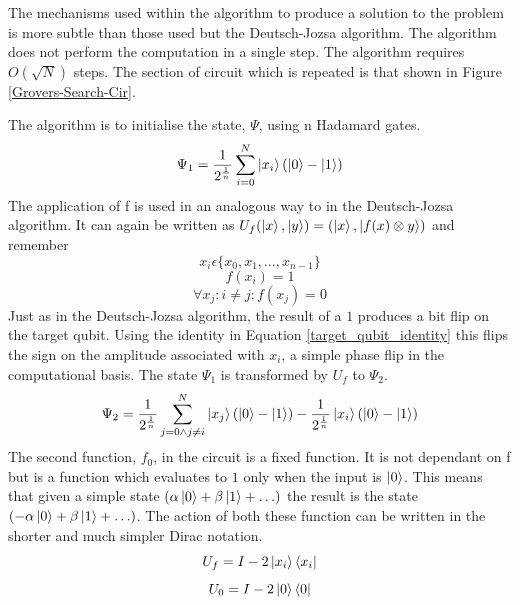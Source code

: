 \documentclass[authoryearcitations]{UoYCSproject}
\begin{document}
The mechanisms used within the algorithm to produce a solution to the problem is more subtle than those used but the Deutsch-Jozsa algorithm.
The algorithm does not perform the computation in a single step.
The algorithm requires $O(\sqrt{N})$ steps.
The section of circuit which is repeated is that shown in Figure \ref{Grovers-Search-Cir}.

The algorithm is to initialise the state, $\Psi$, using n Hadamard gates.
\begin{equation}
\Psi_1=\frac{1}{2^{\frac{1}{n}}}\sum\limits_{i=0}^N \left\vert{x_i}\right\rangle(\left\vert{0}\right\rangle-\left\vert{1}\right\rangle)
\end{equation}
The application of f is used in an analogous way to in the Deutsch-Jozsa algorithm.
It can again be written as $U_f(\left\vert{x}\right\rangle,\left\vert{y}\right\rangle)=(\left\vert{x}\right\rangle,\left\vert{f(x)\otimes{y}}\right\rangle)$ and remember
\begin{equation}
x_i\epsilon\{x_0,x_1,\ldots,x_{n-1}\}
\end{equation}
\begin{equation}
f(x_i)=1
\end{equation}
\begin{equation}
\forall{x_j} : i\neq{j} : f(x_j)=0
\end{equation}
Just as in the Deutsch-Jozsa algorithm, the result of a $1$ produces a bit flip on the target qubit.
Using the identity in Equation \ref{target_qubit_identity} this flips the sign on the amplitude associated with $x_i$, a simple phase flip in the computational basis.
The state $\Psi_1$ is transformed by $U_f$ to $\Psi_2$.
\begin{equation}
\Psi_2=\frac{1}{2^{\frac{1}{n}}}\sum\limits_{j=0\wedge{j}\neq{i}}^N \left\vert{x_j}\right\rangle(\left\vert{0}\right\rangle-\left\vert{1}\right\rangle) - \frac{1}{2^{\frac{1}{n}}} \left\vert{x_i}\right\rangle(\left\vert{0}\right\rangle-\left\vert{1}\right\rangle)
\end{equation}
The second function, $f_0$, in the circuit is a fixed function.
It is not dependant on f but is a function which evaluates to $1$ only when the input is $\left\vert{0}\right\rangle$.
This means that given a simple state $(\alpha\left\vert{0}\right\rangle+\beta\left\vert{1}\right\rangle+\ldots)$ the result is the state $(-\alpha\left\vert{0}\right\rangle+\beta\left\vert{1}\right\rangle+\ldots)$.
The action of both these function can be written in the shorter and much simpler Dirac notation.
\begin{equation}
U_f=I-2\left\vert{x_i}\right\rangle\left\langle{x_i}\right\vert
\end{equation}
\begin{equation}
U_0=I-2\left\vert{0}\right\rangle\left\langle{0}\right\vert
\label{Grover:U_0_dirac}
\end{equation}
\end{document}
